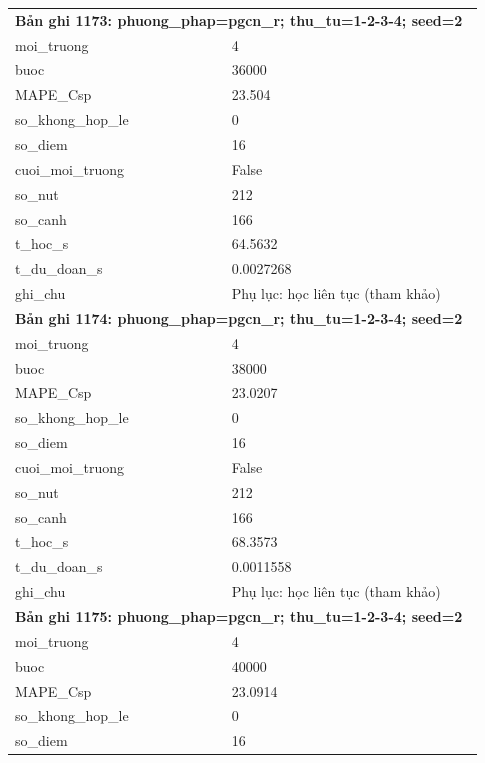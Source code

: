 \begin{longtable}{p{0.43\linewidth}p{0.50\linewidth}}
\midrule
\multicolumn{2}{p{0.95\linewidth}}{\textbf{Bản ghi 1173: phuong\_phap=pgcn\_r; thu\_tu=1-2-3-4; seed=2}} \\
moi\_\allowbreak truong & 4 \\
buoc & 36000 \\
MAPE\_\allowbreak Csp & 23.504 \\
so\_\allowbreak khong\_\allowbreak hop\_\allowbreak le & 0 \\
so\_\allowbreak diem & 16 \\
cuoi\_\allowbreak moi\_\allowbreak truong & False \\
so\_\allowbreak nut & 212 \\
so\_\allowbreak canh & 166 \\
t\_\allowbreak hoc\_\allowbreak s & 64.5632 \\
t\_\allowbreak du\_\allowbreak doan\_\allowbreak s & 0.0027268 \\
ghi\_\allowbreak chu & Phụ lục: học liên tục (tham khảo) \\
\midrule
\multicolumn{2}{p{0.95\linewidth}}{\textbf{Bản ghi 1174: phuong\_phap=pgcn\_r; thu\_tu=1-2-3-4; seed=2}} \\
moi\_\allowbreak truong & 4 \\
buoc & 38000 \\
MAPE\_\allowbreak Csp & 23.0207 \\
so\_\allowbreak khong\_\allowbreak hop\_\allowbreak le & 0 \\
so\_\allowbreak diem & 16 \\
cuoi\_\allowbreak moi\_\allowbreak truong & False \\
so\_\allowbreak nut & 212 \\
so\_\allowbreak canh & 166 \\
t\_\allowbreak hoc\_\allowbreak s & 68.3573 \\
t\_\allowbreak du\_\allowbreak doan\_\allowbreak s & 0.0011558 \\
ghi\_\allowbreak chu & Phụ lục: học liên tục (tham khảo) \\
\midrule
\multicolumn{2}{p{0.95\linewidth}}{\textbf{Bản ghi 1175: phuong\_phap=pgcn\_r; thu\_tu=1-2-3-4; seed=2}} \\
moi\_\allowbreak truong & 4 \\
buoc & 40000 \\
MAPE\_\allowbreak Csp & 23.0914 \\
so\_\allowbreak khong\_\allowbreak hop\_\allowbreak le & 0 \\
so\_\allowbreak diem & 16 \\

\end{longtable}
